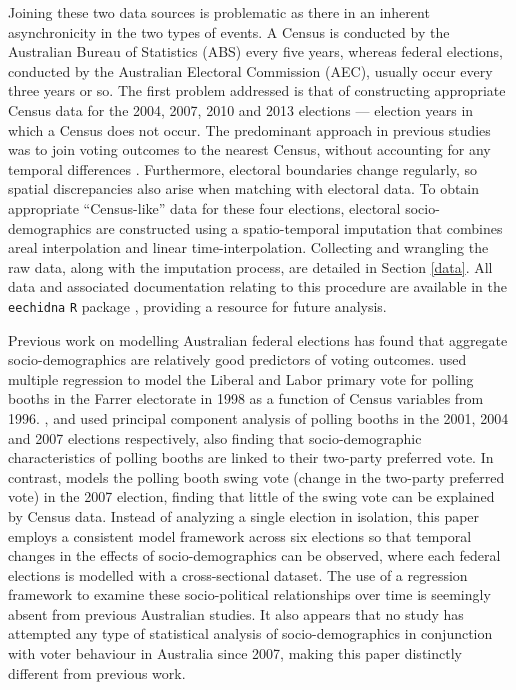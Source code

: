 \documentclass[11pt,a4paper,]{article}
\begin{document}
Joining these two data sources is problematic as there in an inherent asynchronicity in the two types of events. A Census is conducted by the Australian Bureau of Statistics (ABS) every five years, whereas federal elections, conducted by the Australian Electoral Commission (AEC), usually occur every three years or so. The first problem addressed is that of constructing appropriate Census data for the 2004, 2007, 2010 and 2013 elections --- election years in which a Census does not occur. The predominant approach in previous studies was to join voting outcomes to the nearest Census, without accounting for any temporal differences \autocites[see][]{DavisStimson98}{Stimson06}{Liao09}{Stimson09}. Furthermore, electoral boundaries change regularly, so spatial discrepancies also arise when matching with electoral data. To obtain appropriate ``Census-like'' data for these four elections, electoral socio-demographics are constructed using a spatio-temporal imputation that combines areal interpolation \autocite{Goodchild1993} and linear time-interpolation. Collecting and wrangling the raw data, along with the imputation process, are detailed in Section \ref{data}. All data and associated documentation relating to this procedure are available in the \texttt{eechidna} \texttt{R} package \autocite{eechidna}, providing a resource for future analysis.

Previous work on modelling Australian federal elections has found that aggregate socio-demographics are relatively good predictors of voting outcomes. \textcite{Forrest01} used multiple regression to model the Liberal and Labor primary vote for polling booths in the Farrer electorate in 1998 as a function of Census variables from 1996. \textcite{Stimson06}, \textcite{Stimson09} and \textcite{Stimson12} used principal component analysis of polling booths in the 2001, 2004 and 2007 elections respectively, also finding that socio-demographic characteristics of polling booths are linked to their two-party preferred vote. In contrast, \textcite{Stimson09} models the polling booth swing vote (change in the two-party preferred vote) in the 2007 election, finding that little of the swing vote can be explained by Census data. Instead of analyzing a single election in isolation, this paper employs a consistent model framework across six elections so that temporal changes in the effects of socio-demographics can be observed, where each federal elections is modelled with a cross-sectional dataset. The use of a regression framework to examine these socio-political relationships over time is seemingly absent from previous Australian studies. It also appears that no study has attempted any type of statistical analysis of socio-demographics in conjunction with voter behaviour in Australia since 2007, making this paper distinctly different from previous work.
\end{document}
